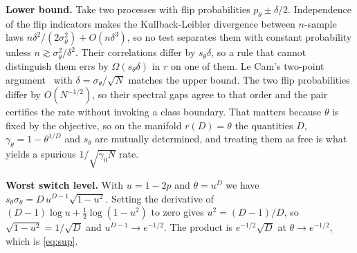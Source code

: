 \noindent\textbf{Lower bound.}
Take two processes with flip probabilities $p_\theta\pm\delta/2$. Independence of
the flip indicators makes the Kullback-Leibler divergence between $n$-sample laws
$n\delta^{2}/(2\sigma^{2}_\theta)+O(n\delta^{3})$, so no test separates them with
constant probability unless $n\gtrsim\sigma^{2}_\theta/\delta^{2}$. Their
correlations differ by $s_\theta\delta$, so a rule that cannot distinguish them
errs by $\Omega(s_\theta\delta)$ in $r$ on one of them. Le Cam's two-point
argument~\cite{tsybakov} with $\delta=\sigma_\theta/\sqrt N$ matches the upper
bound. The two flip probabilities differ by
$O(N^{-1/2})$, so their spectral gaps agree to that order and the pair certifies
the rate without invoking a class boundary. That matters because $\theta$ is fixed
by the objective, so on the manifold $r(D)=\theta$ the quantities $D$,
$\gamma_\theta=1-\theta^{1/D}$ and $s_\theta$ are mutually determined, and treating
them as free is what yields a spurious $1/\sqrt{\gamma_0 N}$ rate.

\noindent\textbf{Worst switch level.}
With $u=1-2p$ and $\theta=u^{D}$ we have
$s_\theta\sigma_\theta=D\,u^{D-1}\sqrt{1-u^{2}}$. Setting the derivative of
$(D-1)\log u+\tfrac12\log(1-u^{2})$ to zero gives $u^{2}=(D-1)/D$, so
$\sqrt{1-u^{2}}=1/\sqrt D$ and $u^{D-1}\to e^{-1/2}$. The product is
$e^{-1/2}\sqrt D$ at $\theta\to e^{-1/2}$, which is \eqref{eq:sup}.
